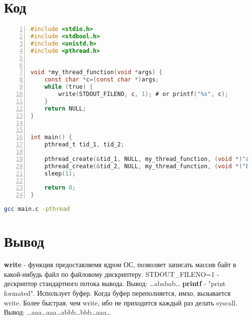 \documentclass[12pt]{article}
\begin{document}
\section{Код}
\begin{lstlisting}[language=C,numbers=left,frame=single]
#include <stdio.h>
#include <stdbool.h>
#include <unistd.h>
#include <pthread.h>


void *my_thread_function(void *args) {
    const char *c=(const char *)args;
    while (true) {
        write(STDOUT_FILENO, c, 1); # or printf("%s", c);
    }
    return NULL;
}


int main() {
    pthread_t tid_1, tid_2;

    pthread_create(&tid_1, NULL, my_thread_function, (void *)"a");
    pthread_create(&tid_2, NULL, my_thread_function, (void *)"b");
    sleep(1);

    return 0;
}
\end{lstlisting}
\begin{lstlisting}[language=bash]
gcc main.c -pthread
\end{lstlisting}
\section{Вывод}
\textbf{write} - функция предоставляемя ядром ОС, позволяет записать массив байт в какой-нибудь файл по файловому дискриптеру. STDOUT\_FILENO=1 - дескриптор стандартного потока вывода.
\newline
Вывод: \dots ababab\dots
\newline
\newline
\textbf{printf} - "print formated". Использует буфер. Когда буфер переполняется, имхо, вызывается write. Более быстрая, чем write, ибо не приходится каждый раз делать syscall.
\newline
Вывод: \dots aaa\dots aaa\dots abbb\dots bbb\dots aaa\dots
\end{document}
